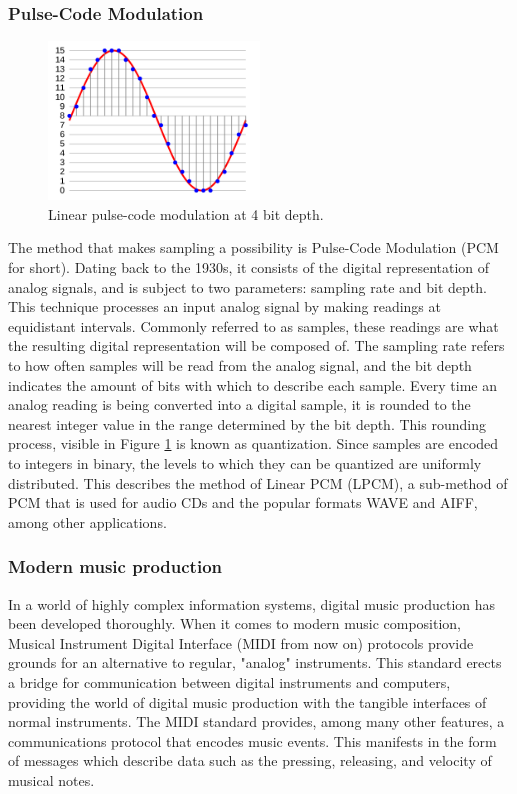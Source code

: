 \documentclass[12pt, a4paper, hidelinks]{article}
\begin{document}
	\subsubsection{Pulse-Code Modulation}
		\begin{figure}[h]
		\centering
		\includegraphics[width=0.5\textwidth]{pcm.png}
		\caption{Linear pulse-code modulation at 4 bit depth. \cite{pcm_img}}
		\label{fig:pcm}
	\end{figure}
	The method that makes sampling a possibility is Pulse-Code Modulation (PCM for short). Dating back to the 1930s, it consists of the digital representation of analog signals, and is subject to two parameters: sampling rate and bit depth. This technique processes an input analog signal by making readings at equidistant intervals. Commonly referred to as samples, these readings are what the resulting digital representation will be composed of. The sampling rate refers to how often samples will be read from the analog signal, and the bit depth indicates the amount of bits with which to describe each sample. Every time an analog reading is being converted into a digital sample, it is rounded to the nearest integer value in the range determined by the bit depth. This rounding process, visible in Figure \ref{fig:pcm} is known as quantization. Since samples are encoded to integers in binary, the levels to which they can be quantized are uniformly distributed. This describes the method of Linear PCM (LPCM), a sub-method of PCM that is used for audio CDs and the popular formats WAVE and AIFF, among other applications.\par
	

	
	\subsubsection{Modern music production} 	
 	In a world of highly complex information systems, digital music production has been developed thoroughly. When it comes to modern music composition, Musical Instrument Digital Interface (MIDI from now on) protocols provide grounds for an alternative to regular, "analog" instruments. This standard erects a bridge for communication between digital instruments and computers, providing the world of digital music production with the tangible interfaces of normal instruments. The MIDI standard provides, among many other features, a communications protocol that encodes music events. This manifests in the form of messages which describe data such as the pressing, releasing, and velocity of musical notes. 	
	 	
\end{document}
